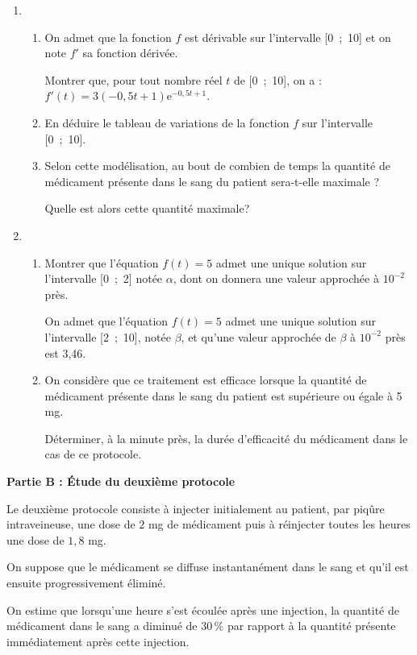 \documentclass[11pt,a4paper,french]{article}
\begin{document}
\begin{enumerate}
\item 
	\begin{enumerate}
		\item On admet que la fonction $f$ est dérivable sur l'intervalle [0~;~10] et on note $f'$ sa fonction dérivée.
		
Montrer que, pour tout nombre réel $t$ de [0~;~10], on a : $f'(t) = 3(- 0,5t + 1)\text{e}^{-0,5t+1}$.
		\item En déduire le tableau de variations de la fonction $f$ sur l'intervalle [0~;~10].
		\item Selon cette modélisation, au bout de combien de temps la quantité de médicament présente dans le sang du patient sera-t-elle maximale ?
		
Quelle est alors cette quantité maximale?
	\end{enumerate}
\item 
	\begin{enumerate}
		\item Montrer que l'équation $f(t) = 5$ admet une unique solution sur l'intervalle [0~;~2] notée $\alpha$, dont on donnera une valeur approchée à $10^{-2}$ près.
		
On admet que l'équation $f(t) = 5$ admet une unique solution sur l'intervalle [2~;~10], notée $\beta$, et qu'une valeur approchée de $\beta$ à $10^{-2}$ près est 3,46.
		\item On considère que ce traitement est efficace lorsque la quantité de médicament présente dans le sang du patient est supérieure ou égale à 5 mg.
		
Déterminer, à la minute près, la durée d'efficacité du médicament dans le cas de ce protocole.
	\end{enumerate}
\end{enumerate}

\bigskip

\textbf{Partie B : Étude du deuxième protocole}

\medskip

Le deuxième protocole consiste à injecter initialement au patient, par piqûre intraveineuse, une dose de $2$ mg de médicament puis à réinjecter toutes les heures une dose de $1,8$ mg.

On suppose que le médicament se diffuse instantanément dans le sang et qu'il est ensuite
progressivement éliminé.

On estime que lorsqu'une heure s'est écoulée après une injection, la quantité de médicament dans le sang a diminué de 30\,\% par rapport à la quantité présente immédiatement après cette injection.
\end{document}
